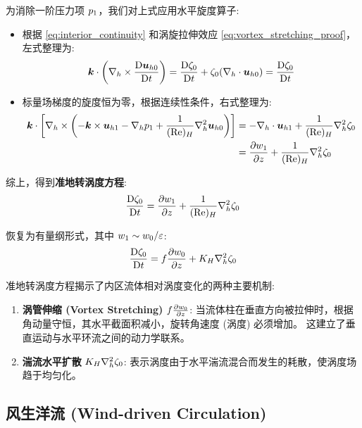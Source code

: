 为消除一阶压力项 $p_1$，我们对上式应用水平旋度算子:
\begin{itemize}
    \item 根据 \eqref{eq:interior_continuity} 和涡旋拉伸效应 \eqref{eq:vortex_stretching_proof}，左式整理为:
    \begin{equation*}
        \bm{k} \cdot \left(\nabla_h \times \frac{\mathrm{D} \bm{u}_{h0}}{\mathrm{D} t}\right) = \frac{\mathrm{D} \zeta_0}{\mathrm{D} t} + \zeta_0 (\nabla_h \cdot \bm{u}_{h0}) = \frac{\mathrm{D} \zeta_0}{\mathrm{D} t}
    \end{equation*}

    \item 标量场梯度的旋度恒为零，根据连续性条件，右式整理为:
    \begin{align*}
        \kvec \cdot \left[\nabla_h \times \left(-\kvec \times \vel_{h1} - \nabla_h \pressure_1 + \frac{1}{(\re)_H} \nabla_h^2 \vel_{h0}\right)\right] &= -\nabla_h \cdot \vel_{h1} + \frac{1}{(\re)_H} \nabla_h^2 \relvort_0 \\
        &= \pde{w_1}{z} + \frac{1}{(\re)_H} \nabla_h^2 \relvort_0
    \end{align*}
\end{itemize}

综上，得到\textbf{准地转涡度方程}:
\begin{equation}
    \matderiv{\relvort_0} = \pde{w_1}{z} + \frac{1}{(\re)_H} \nabla_h^2 \relvort_0
    \label{eq:qg_vorticity_nondim}
\end{equation}

恢复为有量纲形式，其中 $w_1 \sim w_0 / \varepsilon$:
\begin{equation}
    \matderiv{\relvort_0} = \coriolis \pde{w_0}{z} + \eddyvisch \nabla_h^2 \relvort_0
    \label{eq:qg_vorticity}
\end{equation}

准地转涡度方程揭示了内区流体相对涡度变化的两种主要机制:
\begin{enumerate}
    \item \textbf{涡管伸缩 (Vortex Stretching)} $\coriolis \pde{w_0}{z}$:
    当流体柱在垂直方向被拉伸时，根据角动量守恒，其水平截面积减小，旋转角速度 (涡度) 必须增加。
    这建立了垂直运动与水平环流之间的动力学联系。

    \item \textbf{湍流水平扩散} $K_H \nabla_h^2 \zeta_0$:
    表示涡度由于水平湍流混合而发生的耗散，使涡度场趋于均匀化。
\end{enumerate}

\subsection{风生洋流 (Wind-driven Circulation)}


